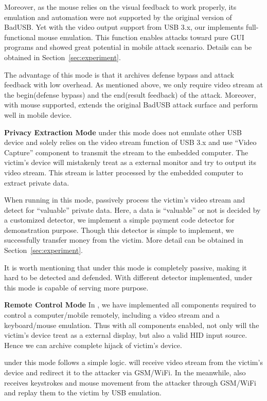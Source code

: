 Moreover, as the mouse relies on the visual feedback to work properly, its emulation and automation were not supported by the original version of BadUSB. Yet with the video output support from USB 3.x, our \tool implements full-functional mouse emulation. This function enables attacks toward pure GUI programs and showed great potential in mobile attack scenario. Details can be obtained in Section~\ref{sec:experiment}.

The advantage of this mode is that it archives defense bypass and attack feedback with low overhead. As mentioned above, we only require video stream at the begin(defense bypass) and the end(result feedback) of the attack. Moreover, with mouse supported, \tool extends the original BadUSB attack surface and perform well in mobile device.

\textbf{Privacy Extraction Mode}
\tool under this mode does not emulate other USB device and solely relies on the video stream function of USB 3.x and use ``Video Capture'' component to transmit the stream to the embedded computer. The victim's device will mistakenly treat \tool as a external monitor and try to output its video stream. This stream is latter processed by the embedded computer to extract private data.

When running in this mode, \tool passively process the victim's video stream and detect for ``valuable'' private data.  Here, a data is ``valuable'' or not is decided by a customized detector, we implement a simple payment code detector for demonstration purpose. Though this detector is simple to implement, we successfully transfer money from the victim. More detail can be obtained in Section~\ref{sec:experiment}.

It is worth mentioning that \tool under this mode is completely passive, making it hard to be detected and defended. With different detector implemented, \tool under this mode is capable of serving more purpose.

\textbf{Remote Control Mode}
In \tool, we have implemented all components required to control a computer/mobile remotely, including a video stream and a keyboard/mouse emulation. Thus with all components enabled, not only will the victim's device treat \tool as a external display, but also a valid HID input source. Hence we can archive complete hijack of victim's device.

\tool under this mode follows a simple logic. \tool will receive video stream from the victim's device and redirect it to the attacker via GSM/WiFi. In the meanwhile, \tool also receives keystrokes and mouse movement from the attacker through GSM/WiFi and replay them to the victim by USB emulation.

